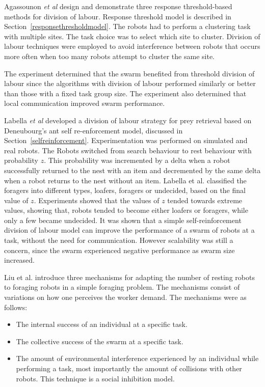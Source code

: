 Agassounon \textit{et al} \cite{agassounon2002efficiency} design and demonstrate three response threshold-based methods for division of labour. Response threshold model is described in Section~\ref{responsethresholdmodel}. The robots had to perform a clustering task with multiple sites. The task choice was to select which site to cluster. Division of labour techniques were employed to avoid interference between robots that occurs more often when too many robots attempt to cluster the same site. 

The experiment determined that the swarm benefited from threshold division of labour since the algorithms with division of labour performed similarly or better than those with a fixed task group size. The experiment also determined that local communication improved swarm performance.

Labella \textit{et al} \cite{labella2006division} developed a division of labour strategy for prey retrieval based on Deneubourg's ant self re-enforcement model, discussed in Section~\ref{selfreinforcement}. Experimentation was performed on simulated and real robots. The Robots switched from search behaviour to rest behaviour with probability $z$. This probability was incremented by a delta when a robot successfully returned to the nest with an item and decremented by the same delta when a robot returns to the nest without an item. Labella et al. classified the foragers into different types, loafers, foragers or  undecided, based on the final value of $z$. Experiments showed that the values of $z$ tended towards extreme values, showing that, robots tended to become either loafers or foragers, while only a few became undecided. It was shown that a simple self-reinforcement division of labour model can improve the performance of a swarm of robots at a task, without the need for communication. However scalability was still a concern, since the swarm experienced negative performance as swarm size increased. 

Liu et al. \cite{liu2007towards} introduce three mechanisms for adapting the number of resting robots to foraging robots in a simple foraging problem. The mechanisms consist of variations on how one perceives the worker demand. The mechanisms were as follows:

\begin{itemize}
	\item The internal success of an individual at a specific task.
	\item The collective success of the swarm at a specific task. 
	\item  The amount of environmental interference experienced by an individual while performing a task, most importantly the amount of collisions with other robots. This technique is a social inhibition model.
\end{itemize}


